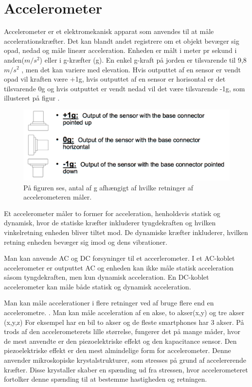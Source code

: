\section{Accelerometer} 
Accelerometer er et elektromekanisk apparat som anvendes til at måle accelerationskræfter. Det kan blandt andet registrere om et objekt bevæger sig opad, nedad og måle lineær acceleration\citep{Goodrich2013}. Enheden er målt i meter pr sekund i anden($m/s^2$) eller i g-kræfter (g). En enkel g-kraft på jorden er tilsvarende til 9,8 $m/s^2$ , men det kan variere med elevation. \citep{Sparkfun}
Hvis outputtet af en sensor er vendt opad vil kraften være +1g, hvis outputtet af en sensor er horisontal er det tilsvarende 0g og hvis outputtet er vendt nedad vil det være tilsvarende -1g, som illusteret på figur . \citep{Instruments}

\begin{figure}[H]
	\centering
	\includegraphics[scale=0.25]{figures/bProblemloesning/g.png}
	\caption{På figuren ses, antal af g afhængigt af hvilke retninger af accelerometeren måler. \citep{Instruments}}
	\label{fig:g}
\end{figure}

Et accelerometer måler to former for acceleration, henholdsvis statisk og dynamisk, hvor de statiske kræfter inkluderer tyngdekraften og hvilken vinkelretning enheden bliver tiltet mod. De dynamiske kræfter inkluderer, hvilken retning enheden bevæger sig imod og dens vibrationer. \citep{Sparkfun,Engineering, Goodrich2013}

Man kan anvende AC og DC forsyninger til et accerlerometer. %
I et AC-koblet accelerometer er outputtet AC og enheden kan ikke måle statisk acceleration såsom tyngdekraften, men kun dynamisk acceleration. 
En DC-koblet accelerometer kan måle  både statisk og dynamisk acceleration. 
 

Man kan måle accelerationer i flere retninger ved af bruge flere end en accelerometre. \citep{Sparkfun}. Man kan måle acceleration af en akse, to akser(x,y) og tre akser (x,y,z) For eksempel har en bil to akser  og de fleste smartphones har 3 akser.\citep{Sparkfun}
På trods af den accelerometerets lille størrelse, fungerer det på mange måder, hvor de mest anvendte er den piezoelektriske effekt og den kapacitance sensor. 
Den piezoelektriske effekt er den mest almindelige form for accelerometer. Denne anvender mikroskopiske krystalstrukturer, som stresses på grund af accelererende kræfter. Disse krystaller skaber en spænding ud fra stressen, hvor accelerometeret fortolker denne spænding til at bestemme hastigheden og retningen.

